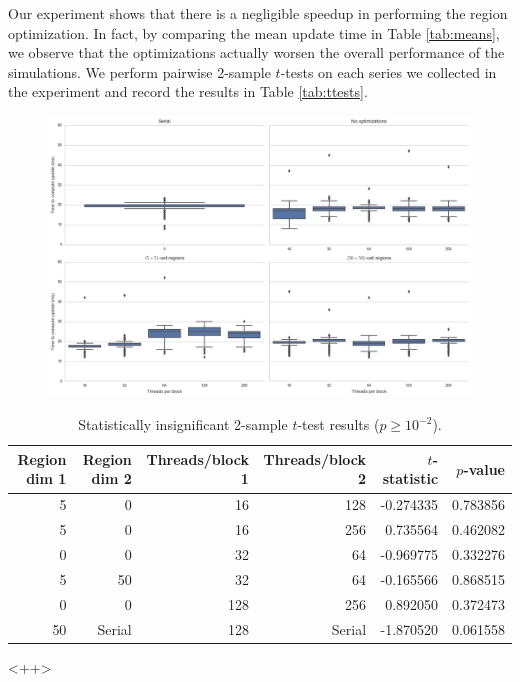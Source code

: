 \documentclass[12pt]{article}
\begin{document}
    Our experiment shows that there is a negligible speedup in performing the
    region optimization. In fact, by comparing the mean update time in Table
    \ref{tab:means}, we observe that the optimizations actually worsen the
    overall performance of the simulations. We perform pairwise 2-sample
    $t$-tests on each series we collected in the experiment and record the
    results in Table \ref{tab:ttests}. 

    

    \begin{figure}[t]
        \centering
        \includegraphics[width=\textwidth]{../images/boxplot.jpg}
        \caption{}
        \label{fig:means}
    \end{figure}

    

    \begin{table}
        \centering
        \begin{tabular}{rrrrrr} \toprule
            Region dim 1 &  Region dim 2  &
            Threads/block 1 &  Threads/block 2 &  $t$-statistic & $p$-value \\ \midrule
 5 &   0  & 16 & 128  &   -0.274335&  0.783856 \\
 5 &   0  & 16 & 256  &    0.735564&  0.462082 \\
 0 &   0  & 32 &  64  &   -0.969775&  0.332276 \\
 5 &  50  & 32 &  64  &   -0.165566&  0.868515 \\
 0 &   0  & 128 & 256 &    0.892050 &  0.372473 \\
50 &  Serial  & 128 &   Serial &   -1.870520 &  0.061558 \\
\bottomrule
\end{tabular}
        \caption{Statistically insignificant 2-sample $t$-test results ($p \geq 
            10^{-2}$).}
        \label{tab:stats}
    \end{table}<++>
\end{document}
